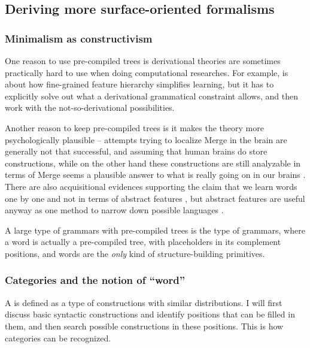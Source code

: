 \documentclass[../main.tex]{subfiles}
\begin{document}
\subsection{Deriving more surface-oriented formalisms}

\subsubsection{Minimalism as constructivism}\label{sec:routine}

One reason to use pre-compiled trees is derivational theories are sometimes 
practically hard to use when doing computational researches. For example, \citet{liter2020modeling}
is about how fine-grained feature hierarchy simplifies learning, but it has to explicitly solve out what 
a derivational grammatical constraint allows, and then work with the not-so-derivational possibilities.

Another reason to keep pre-compiled trees is it makes the theory more psychologically plausible --
attempts trying to localize Merge in the brain are generally not that successful, and assuming that 
human brains do store constructions, while on the other hand these constructions are still analyzable 
in terms of Merge seems a plausible answer to what is really going on in our brains
\citep{brain-syntax-1,brain-syntax-2}. There are also acquisitional evidences supporting the claim 
that we learn words one by one and not in terms of abstract features \citep{white2022lexicalization},
but abstract features are useful anyway as one method to narrow down possible languages \citep{liter2020modeling}.

A large type of grammars with pre-compiled trees is the type of  grammars, where 
a word is actually a pre-compiled tree, with placeholders in its complement positions, and words 
are the \emph{only} kind of structure-building primitives. %

\subsubsection{Categories and the notion of ``word''}

A  is defined as a type of constructions with similar distributions.
I will first discuss basic syntactic constructions and identify positions that can be filled in them, 
and then search possible constructions in these positions. This is how categories can be recognized.
\end{document}
